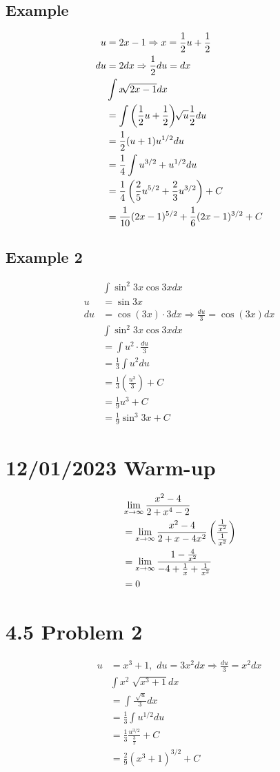 \documentclass[11pt]{article}
\newcommand*{\set}{\setcounter{equation}{0}}
\begin{document}
\subsection{Example}
\begin{align}
    \set
    u&=2x-1\Rightarrow x=\frac{1}{2}u+\frac{1}{2}\\
    du&=2dx\Rightarrow \frac{1}{2}du=dx\\
    &\int x\sqrt[]{2x-1}dx\\
    &=\int\left(\frac{1}{2}u+\frac{1}{2}\right)\sqrt[]{u}\frac{1}{2}du\\
    &=\frac{1}{2}(u+1)u^{1/2}du\\
    &=\frac{1}{4}\int u^{3/2}+u^{1/2}du\\
    &=\frac{1}{4}\left(\frac{2}{5}u^{5/2}+\frac{2}{3}u^{3/2}\right)+C\\
    &=\frac{1}{10}(2x-1)^{5/2}+\frac{1}{6}(2x-1)^{3/2}+C
\end{align}

\subsection{Example 2}
\begin{align}
    &\int\sin^2 3x\cos 3xdx\\
    u&=\sin 3x\\
    du&=\cos(3x)\cdot 3dx\Rightarrow \frac{du}{3}=\cos(3x)dx\\
    &\int\sin^2 3x\cos 3xdx\\
    &=\int u^2\cdot\frac{du}{3}\\
    &=\frac{1}{3}\int u^2du\\
    &=\frac{1}{3}\left(\frac{u^3}{3}\right)+C\\
    &=\frac{1}{9}u^3+C\\
    &=\frac{1}{9}\sin^3 3x+C
\end{align}

\section{12/01/2023 Warm-up}

\begin{align}
    \set
    &\lim_{x\to\infty}\frac{x^2-4}{2+x^4-2}\\
    &=\lim_{x\to\infty}\frac{x^2-4}{2+x-4x^2}\left(\frac{\frac{1}{x^2}}{\frac{1}{x^2}}\right)\\
    &=\lim_{x\to\infty}\frac{1-\frac{4}{x^2}}{-4+\frac{1}{x}+\frac{1}{x^2}}\\
    &=0
\end{align}

\section{4.5 Problem 2}
\begin{align}
    u&=x^3+1,\,\, du=3x^2dx\Rightarrow\frac{du}{3}=x^2dx\\
    &\int x^2\sqrt[]{x^3+1}dx\\
    &=\int\frac{\sqrt[]{u}}{3}dx\\
    &=\frac{1}{3}\int u^{1/2}du\\
    &=\frac{1}{3}\frac{u^{3/2}}{\frac{3}{2}}+C\\
    &=\frac{2}{9}(x^3+1)^{3/2}+C
\end{align}
\end{document}
